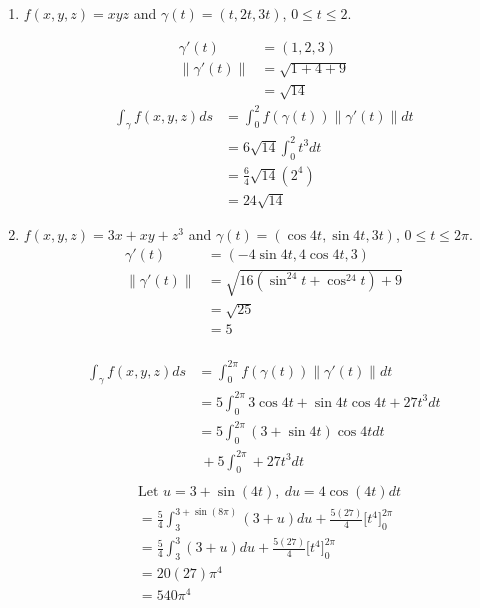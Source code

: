 \documentclass{article}
\newcommand{\norm}[1]{\| #1 \|}
\begin{document}
\begin{enumerate}
\begin{enumerate}
    \item $f(x,y,z) = xyz$ and $\gamma(t) = (t,2t,3t)$, $0\leq t \leq 2$.
    \begin{multicols}{2} 
    \noindent
    \begin{align*} 
        \gamma'(t) &= (1,2,3) \\
        \norm{\gamma'(t)} &= \sqrt{1 + 4 + 9} \\
        &= \sqrt{14}
    \end{align*}
    \begin{align*} 
        \int_{\gamma}f(x,y,z)ds &= \int_0^2 f(\gamma(t)) \norm{\gamma'(t)}dt \\
        &= 6\sqrt{14} \int_0^2 t^3 dt\\
        &= \frac{6}{4}\sqrt{14}(2^4) \\ 
        &= 24\sqrt{14}
    \end{align*}
    \end{multicols}

    \item $f(x,y,z) = 3x + xy + z^3$ and $\gamma(t) = ( \cos 4t, \sin 4t, 3t)$, $0 \leq t \leq 2\pi$.
    \begin{align*} 
        \gamma'(t) &= (-4 \sin 4t, 4 \cos 4t, 3) \\
        \norm{\gamma'(t)} &= \sqrt{16( \sin^24t + \cos^24t) + 9} \\
        &= \sqrt{25} \\
        &= 5 \\
    \end{align*}
    \begin{multicols}{2} 
    \noindent
    \begin{align*} 
        \int_{\gamma}f(x,y,z)ds &= \int_0^{2\pi} f(\gamma(t)) \norm{\gamma'(t)}dt \\
        &= 5 \int_0^{2\pi} 3\cos 4t + \sin 4t \cos 4t + 27t^3 dt\\
        &= 5 \int_0^{2\pi} (3 + \sin 4t) \cos 4t dt \\ 
        &\: +5 \int_0^{2\pi} + 27t^3 dt\\
    \end{align*}
    \begin{align*} 
        &\text{Let } u = 3 + \sin(4t),\: du = 4\cos(4t)dt \\
        &= \frac{5}{4} \int_3^{3 + \sin(8\pi)} (3 + u) du + \frac{5(27)}{4}\Big[t^4\Big]_0^{2\pi}\\
        &= \frac{5}{4} \int_3^{3} (3 + u) du + \frac{5(27)}{4}\Big[t^4\Big]_0^{2\pi}\\
        &= 20(27)\pi^4 \\
        &= 540\pi^4 \\
    \end{align*}
    \end{multicols}
    

\end{enumerate}
\end{enumerate}
\end{document}
